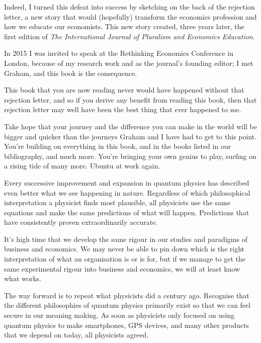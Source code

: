 \begin{longstoryblock}
Indeed, I turned this defeat into success by sketching on the back of the rejection letter, a new story that would (hopefully) transform the economics profession and how we educate our economists. This new story created, three years later, the first edition of \emph{The International Journal of Pluralism and Economics Education}.


In 2015 I was invited to speak at the Rethinking Economics Conference in London, because of my research work and as the journal’s founding editor; I met Graham, and this book is the consequence.


This book that you are now reading never would have happened without that rejection letter, and so if you derive any benefit from reading this book, then that rejection letter may well have been the best thing that ever happened to me.


Take hope that your journey and the difference you can make in the world will be bigger and quicker than the journeys Graham and I have had to get to this point. You're building on everything in this book, and in the books listed in our bibliography, and much more. You're bringing your own genius to play, surfing on a rising tide of many more. Ubuntu at work again. 
\end{longstoryblock}




Every successive improvement and expansion in quantum physics  has described even better what we see happening in nature. Regardless of which philosophical interpretation a physicist finds most plausible, all physicists use the same equations and make the same predictions of what will happen. Predictions that have consistently proven extraordinarily accurate.


It's high time that we develop the same rigour in our studies and paradigms of business and economics. We may never be able to pin down which is the right interpretation of what an organisation is or is for, but if we manage to get the same experimental rigour into business and economics, we will at least know what works. 


The way forward is to repeat what physicists did a century ago. Recognise that the different philosophies of quantum physics primarily exist so that we can feel secure in our meaning making. As soon as physicists only focused on using quantum physics to make smartphones, GPS devices, and many other products that we depend on today, all physicists agreed.



